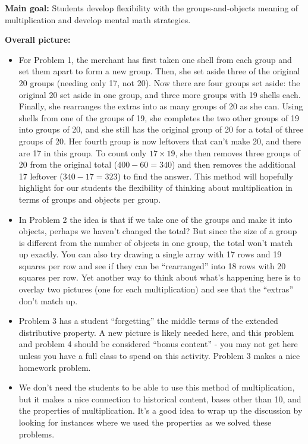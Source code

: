 \documentclass[nooutcomes, noauthor]{ximera}
\begin{document}
\newpage
\begin{instructorNotes}
{\bf Main goal:} Students develop flexibility with the groups-and-objects meaning of multiplication and develop mental math strategies.


{\bf Overall picture:} 
\begin{itemize}
	\item For Problem 1, the merchant has first taken one shell from each group and set them apart to form a new group. Then, she set aside three of the original 20 groups (needing only 17, not 20). Now there are four groups set aside: the original 20 set aside in one group, and three more groups with 19 shells each. Finally, she rearranges the extras into as many groups of 20 as she can. Using shells from one of the groups of 19, she completes the two other groups of 19 into groups of 20, and she still has the original group of 20 for a total of three groups of 20. Her fourth group is now leftovers that can't make 20, and there are 17 in this group. To count only $17\times 19$, she then removes three groups of 20 from the original total ($400 - 60 = 340$) and then removes the additional 17 leftover ($340 - 17 = 323$) to find the answer. This method will hopefully highlight for our students the flexibility of thinking about multiplication in terms of groups and objects per group.
	\item In Problem 2 the idea is that if we take one of the groups and make it into objects, perhaps we haven't changed the total? But since the size of a group is different from the number of objects in one group, the total won't match up exactly. You can also try drawing a single array with 17 rows and 19 squares per row and see if they can be ``rearranged'' into 18 rows with 20 squares per row. Yet another way to think about what's happening here is to overlay two pictures (one for each multiplication) and see that the ``extras'' don't match up.
	\item Problem 3 has a student ``forgetting'' the middle terms of the extended distributive property. A new picture is likely needed here, and this problem and problem 4 should be considered ``bonus content'' - you may not get here unless you have a full class to spend on this activity. Problem 3 makes a nice homework problem.
	\item We don't need the students to be able to use this method of multiplication, but it makes a nice connection to historical content, bases other than 10, and the properties of multiplication. It's a good idea to wrap up the discussion by looking for instances where we used the properties as we solved these problems.


\end{itemize}
\end{instructorNotes}
\end{document}
